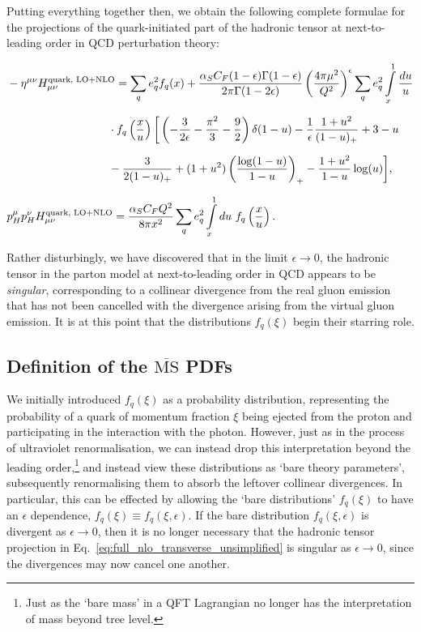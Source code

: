 \documentclass[withindex,glossary]{cam-thesis}
\begin{document}
\noindent Putting everything together then, we obtain the following complete formulae for the projections of the quark-initiated part of the hadronic tensor at next-to-leading order in QCD perturbation theory:
\begin{framed}
\begin{align}
\label{eq:full_nlo_transverse_unsimplified}
&-\eta^{\mu\nu} H_{\mu\nu}^{\text{quark, LO+NLO}} = \sum_{q} e_q^2 f_q(x) + \frac{\alpha_S C_F (1-\epsilon) \Gamma(1-\epsilon)}{2\pi \Gamma(1-2\epsilon)} \left( \frac{4\pi \mu^2}{Q^2} \right)^{\epsilon} \sum_{q} e_q^2 \int\limits_{x}^{1} \frac{du}{u} \notag \\[1.5ex]
&\qquad\qquad\qquad\qquad\quad \cdot f_q\left( \frac{x}{u} \right)\bigg[ \left( -\frac{3}{2\epsilon} - \frac{\pi^2}{3} - \frac{9}{2} \right) \delta(1-u) - \frac{1}{\epsilon} \frac{1 + u^2}{(1-u)_+} + 3 - u \notag \\[1.5ex]
&\qquad\qquad\qquad\qquad\quad - \frac{3}{2(1-u)_+} + (1+u^2) \left( \frac{\log(1-u)}{1-u} \right)_+ - \frac{1+u^2}{1-u} \log(u) \bigg], \\[1.5ex]
&p_H^{\mu} p_H^{\nu} H_{\mu\nu}^{\text{quark, LO+NLO}} = \frac{\alpha_S C_F Q^2}{8\pi x^2}  \sum_{q} e_q^2 \int\limits_{x}^{1} du\ f_q\left( \frac{x}{u} \right).
\end{align}
\end{framed}
\noindent Rather disturbingly, we have discovered that in the limit $\epsilon \rightarrow 0$, the hadronic tensor in the parton model at next-to-leading order in QCD appears to be \textit{singular}, corresponding to a collinear divergence from the real gluon emission that has not been cancelled with the divergence arising from the virtual gluon emission. It is at this point that the distributions $f_{q}(\xi)$ begin their starring role. 

\subsection{Definition of the $\overline{\text{MS}}$ PDFs} 
We initially introduced $f_q(\xi)$ as a probability distribution, representing the probability of a quark of momentum fraction $\xi$ being ejected from the proton and participating in the interaction with the photon. However, just as in the process of ultraviolet renormalisation, we can instead drop this interpretation beyond the leading order,\footnote{Just as the `bare mass' in a QFT Lagrangian no longer has the interpretation of mass beyond tree level.} and instead view these distributions as `bare theory parameters', subsequently renormalising them to absorb the leftover collinear divergences. In particular, this can be effected by allowing the `bare distributions' $f_q(\xi)$ to have an $\epsilon$ dependence, $f_q(\xi) \equiv f_q(\xi,\epsilon)$. If the bare distribution $f_q(\xi,\epsilon)$ is divergent as $\epsilon \rightarrow 0$, then it is no longer necessary that the hadronic tensor projection in Eq.~\eqref{eq:full_nlo_transverse_unsimplified} is singular as $\epsilon \rightarrow 0$, since the divergences may now cancel one another. 
\end{document}
